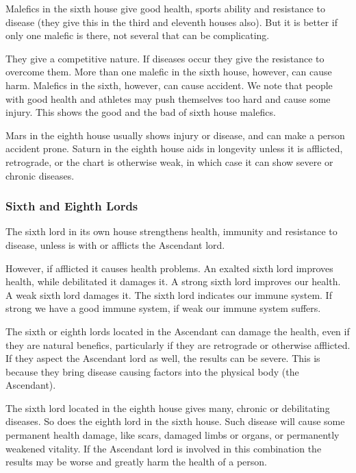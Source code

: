  

Malefics in the sixth house give good health, sports ability and resistance to disease (they give this in the third and eleventh houses also). But it is better if only one malefic is there, not several that can be complicating.
 

They give a competitive nature. If diseases occur they give the resistance to overcome them. More than one malefic in the sixth house, however, can cause harm. Malefics in the sixth, however, can cause accident. We note that people with good health and athletes may push themselves too hard and cause some injury. This shows the good and the bad of sixth house malefics.

 

Mars in the eighth house usually shows injury or disease, and can make a person accident prone. Saturn in the eighth house aids in longevity unless it is afflicted, retrograde, or the chart is otherwise weak, in which case it can show severe or chronic diseases.

 

\subsubsection{Sixth and Eighth Lords}

 

The sixth lord in its own house strengthens health, immunity and resistance to disease, unless is with or afflicts the Ascendant lord.
 

However, if afflicted it causes health problems. An exalted sixth lord improves health, while debilitated it damages it. A strong sixth lord improves our health. A weak sixth lord damages it. The sixth lord indicates our immune system. If strong we have a good immune system, if weak our immune system suffers.

 

The sixth or eighth lords located in the Ascendant can damage the health, even if they are natural benefics, particularly if they are retrograde or otherwise afflicted. If they aspect the Ascendant lord as well, the results can be severe. This is because they bring disease causing factors into the physical body (the Ascendant).

 

The sixth lord located in the eighth house gives many, chronic or debilitating diseases. So does the eighth lord in the sixth house. Such disease will cause some permanent health damage, like scars, damaged limbs or organs, or permanently weakened vitality. If the Ascendant lord is involved in this combination the results may be worse and greatly harm the health of a person.

